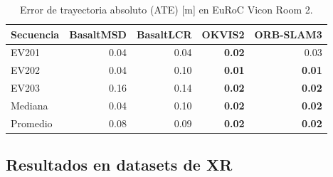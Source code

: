 \begin{table}[!htbp]
\centering
\caption{Error de trayectoria absoluto (ATE) [m] en EuRoC Vicon Room 2.}
\label{tab:V2_sota_ate}
\begin{tabular}{lrrrr}
\toprule
\textbf{Secuencia} & \textbf{BasaltMSD} & \textbf{BasaltLCR} & \textbf{OKVIS2} & \textbf{ORB-SLAM3} \\
\midrule
EV201 & 0.04 & 0.04 & \textbf{0.02} & 0.03 \\
EV202 & 0.04 & 0.10 & \textbf{0.01} & \textbf{0.01} \\
EV203 & 0.16 & 0.14 & \textbf{0.02} & \textbf{0.02} \\
\midrule
Mediana & 0.04 & 0.10 & \textbf{0.02} & \textbf{0.02} \\
Promedio & 0.08 & 0.09 & \textbf{0.02} & \textbf{0.02} \\
\bottomrule
\end{tabular}
\end{table}

\subsection{Resultados en datasets de XR}

